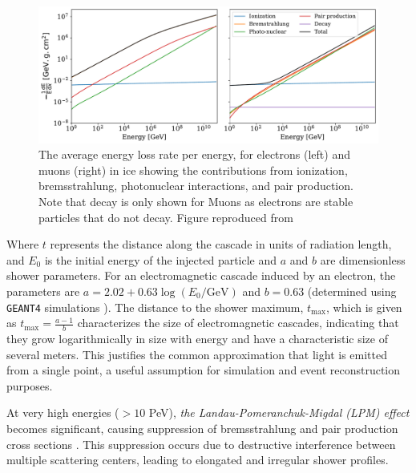 \begin{figure}
	\centering \includegraphics{./figures/nu_in_icecube/energylosses.pdf}
	\caption{The average energy loss rate per energy, for electrons (left) and muons (right) in
    ice showing the contributions from ionization, bremsstrahlung, photonuclear interactions, and pair production. Note that decay is only shown for Muons as electrons are stable particles that do not decay. Figure reproduced from \cite{MMC_paper}}
\end{figure}


Where $t$ represents the distance along the cascade in units of radiation length, and $E_0$ is the initial energy of the injected particle and $a$ and $b$ are dimensionless shower parameters. For an electromagnetic cascade induced by an electron, the parameters are $a = 2.02 + 0.63 \log(E_0/\text{GeV})$ and $b = 0.63$ (determined using \texttt{GEANT4} simulations  ). The distance to the shower maximum, $t_{\text{max}}$, which is given as $t_{\text{max}}=\frac{a-1}{b}$ characterizes the size of electromagnetic cascades, indicating that they grow logarithmically in size with energy and have a characteristic size of several meters. This justifies the common approximation that light is emitted from a single point, a useful assumption for simulation and event reconstruction purposes.

At very high energies ($>10$ PeV), \emph{the Landau-Pomeranchuk-Migdal (LPM) effect} becomes significant, causing suppression of bremsstrahlung and pair production cross sections . This suppression occurs due to destructive interference between multiple scattering centers, leading to elongated and irregular shower profiles.

